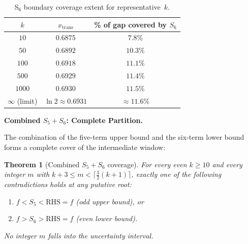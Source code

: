 \documentclass[12pt,a4paper]{article}
\theoremstyle{plain}
\newtheorem{theorem}{Theorem}[section]
\theoremstyle{definition}
\begin{document}
\begin{table}[htbp]
\centering
\caption{S$_6$ boundary coverage extent for representative~$k$.}
\label{tab:S6-coverage}
\begin{tabular}{ccc}
\toprule
$k$ & $x_{\mathrm{trans}}$ & \% of gap covered by $S_6$ \\
\midrule
$10$  & $0.6875$  & $7.8\%$ \\
$50$  & $0.6892$  & $10.3\%$ \\
$100$ & $0.6918$  & $11.1\%$ \\
$500$ & $0.6929$  & $11.4\%$ \\
$1000$ & $0.6930$  & $11.5\%$ \\
$\infty$ (limit) & $\ln 2 \approx 0.6931$ & $\approx 11.6\%$ \\
\bottomrule
\end{tabular}
\end{table}

\medskip
\noindent\textbf{Combined $S_5 + S_6$: Complete Partition.}
\label{sec:combined-partition}

The combination of the five-term upper bound and the six-term lower bound
forms a complete cover of the intermediate window:

\begin{theorem}[Combined $S_5 + S_6$ coverage]\label{thm:combined}
  For every even $k \ge 10$ and every integer $m$ with
  $k+3 \le m < \lceil\frac{3}{2}(k+1)\rceil$, exactly one of the
  following contradictions holds at any putative root:
  \begin{enumerate}[label=(\arabic*), nosep]
    \item $f < S_5 < \mathrm{RHS} = f$ (odd upper bound), or
    \item $f > S_6 > \mathrm{RHS} = f$ (even lower bound).
  \end{enumerate}
  No integer $m$ falls into the uncertainty interval.
\end{theorem}
\end{document}
